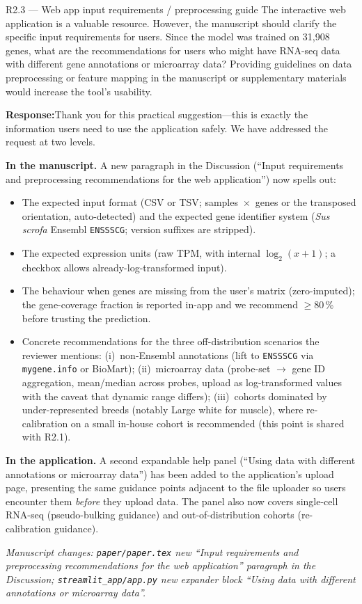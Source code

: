 \documentclass[11pt,a4paper]{article}
\newcommand{\response}[1]{%
  \par\vspace{2pt}\noindent\textbf{\textcolor{respcolor}{Response:}}\;\;#1\par\vspace{6pt}}
\newcommand{\changeloc}[1]{\par\noindent\textit{\small Manuscript changes: #1}\par}
\begin{document}
\begin{reviewerbox}{R2.3 — Web app input requirements / preprocessing guide}
The interactive web application is a valuable resource. However, the
manuscript should clarify the specific input requirements for users. Since
the model was trained on 31,908 genes, what are the recommendations for users
who might have RNA-seq data with different gene annotations or microarray
data? Providing guidelines on data preprocessing or feature mapping in the
manuscript or supplementary materials would increase the tool's usability.
\end{reviewerbox}

\response{Thank you for this practical suggestion---this is exactly the
information users need to use the application safely. We have addressed
the request at two levels.

\textbf{In the manuscript.} A new paragraph in the Discussion
(``Input requirements and preprocessing recommendations for the web
application'') now spells out:
\begin{itemize}[leftmargin=*, itemsep=2pt, topsep=2pt]
  \item The expected input format (CSV or TSV; samples~$\times$~genes or
        the transposed orientation, auto-detected) and the expected gene
        identifier system (\textit{Sus scrofa} Ensembl
        \texttt{ENSSSCG}; version suffixes are stripped).
  \item The expected expression units (raw TPM, with internal
        $\log_2(x+1)$; a checkbox allows already-log-transformed input).
  \item The behaviour when genes are missing from the user's matrix
        (zero-imputed); the gene-coverage fraction is reported in-app
        and we recommend $\geq$80\,\% before trusting the prediction.
  \item Concrete recommendations for the three off-distribution
        scenarios the reviewer mentions: (i)~non-Ensembl annotations
        (lift to \texttt{ENSSSCG} via \texttt{mygene.info} or BioMart);
        (ii)~microarray data (probe-set $\rightarrow$ gene ID
        aggregation, mean/median across probes, upload as
        log-transformed values with the caveat that dynamic range
        differs); (iii)~cohorts dominated by under-represented breeds
        (notably Large white for muscle), where re-calibration on a
        small in-house cohort is recommended (this point is shared with
        R2.1).
\end{itemize}

\textbf{In the application.} A second expandable help panel
(``Using data with different annotations or microarray data'') has
been added to the application's upload page, presenting the same
guidance points adjacent to the file uploader so users encounter them
\emph{before} they upload data. The panel also now covers single-cell
RNA-seq (pseudo-bulking guidance) and out-of-distribution cohorts
(re-calibration guidance).}
\changeloc{\texttt{paper/paper.tex} new ``Input requirements and
preprocessing recommendations for the web application'' paragraph in the
Discussion; \texttt{streamlit\_app/app.py} new expander block
``Using data with different annotations or microarray data''.}
\end{document}
